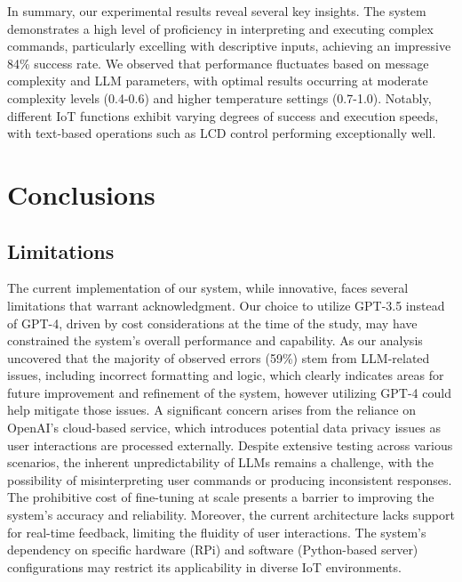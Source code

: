 \documentclass{ieeeaccess}
\begin{document}
In summary, our experimental results reveal several key insights. The system demonstrates a high level of proficiency in interpreting and executing complex commands, particularly excelling with descriptive inputs, achieving an impressive 84\% success rate. We observed that performance fluctuates based on message complexity and LLM parameters, with optimal results occurring at moderate complexity levels (0.4-0.6) and higher temperature settings (0.7-1.0). Notably, different IoT functions exhibit varying degrees of success and execution speeds, with text-based operations such as LCD control performing exceptionally well. 






\section{Conclusions}\label{sec:conclusion}
\subsection{Limitations}
The current implementation of our system, while innovative, faces several limitations that warrant acknowledgment. Our choice to utilize GPT-3.5 instead of GPT-4, driven by cost considerations at the time of the study, may have constrained the system's overall performance and capability. As our analysis uncovered that the majority of observed errors (59\%) stem from LLM-related issues, including incorrect formatting and logic, which clearly indicates areas for future improvement and refinement of the system, however utilizing GPT-4 could help mitigate those issues. A significant concern arises from the reliance on OpenAI's cloud-based service, which introduces potential data privacy issues as user interactions are processed externally. Despite extensive testing across various scenarios, the inherent unpredictability of LLMs remains a challenge, with the possibility of misinterpreting user commands or producing inconsistent responses. The prohibitive cost of fine-tuning at scale presents a barrier to improving the system's accuracy and reliability. Moreover, the current architecture lacks support for real-time feedback, limiting the fluidity of user interactions. The system's dependency on specific hardware (RPi) and software (Python-based server) configurations may restrict its applicability in diverse IoT environments.
\end{document}
